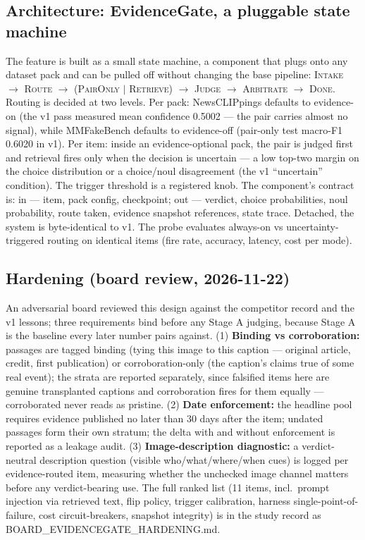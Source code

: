 \documentclass{article}
\begin{document}
\subsection{Architecture: EvidenceGate, a pluggable state machine}
The feature is built as a small state machine, a component that plugs onto any
dataset pack and can be pulled off without changing the base pipeline:
\textsc{Intake} $\rightarrow$ \textsc{Route} $\rightarrow$
(\textsc{PairOnly} $|$ \textsc{Retrieve}) $\rightarrow$ \textsc{Judge}
$\rightarrow$ \textsc{Arbitrate} $\rightarrow$ \textsc{Done}. Routing is decided at
two levels. Per pack: NewsCLIPpings defaults to evidence-on (the v1 pass measured
mean confidence 0.5002 --- the pair carries almost no signal), while MMFakeBench
defaults to evidence-off (pair-only test macro-F1 0.6020 in v1). Per item: inside
an evidence-optional pack, the pair is judged first and retrieval fires only when
the decision is uncertain --- a low top-two margin on the choice distribution or
a choice/noul disagreement (the v1 ``uncertain'' condition). The trigger
threshold is a registered knob. The component's contract is: in --- item, pack
config, checkpoint; out --- verdict, choice probabilities, noul probability,
route taken, evidence snapshot references, state trace. Detached, the system is
byte-identical to v1. The probe evaluates always-on vs uncertainty-triggered
routing on identical items (fire rate, accuracy, latency, cost per mode).

\subsection{Hardening (board review, 2026-11-22)}
An adversarial board reviewed this design against the competitor record and the
v1 lessons; three requirements bind before any Stage A judging, because Stage A
is the baseline every later number pairs against. (1) \textbf{Binding vs
corroboration:} passages are tagged binding (tying this image to this caption ---
original article, credit, first publication) or corroboration-only (the caption's
claims true of some real event); the strata are reported separately, since
falsified items here are genuine transplanted captions and corroboration fires
for them equally --- corroborated never reads as pristine. (2) \textbf{Date
enforcement:} the headline pool requires evidence published no later than 30 days
after the item; undated passages form their own stratum; the delta with and
without enforcement is reported as a leakage audit. (3) \textbf{Image-description
diagnostic:} a verdict-neutral description question (visible who/what/where/when
cues) is logged per evidence-routed item, measuring whether the unchecked image
channel matters before any verdict-bearing use. The full ranked list (11 items,
incl.\ prompt injection via retrieved text, flip policy, trigger calibration,
harness single-point-of-failure, cost circuit-breakers, snapshot integrity) is in
the study record as BOARD\_EVIDENCEGATE\_HARDENING.md.
\end{document}
